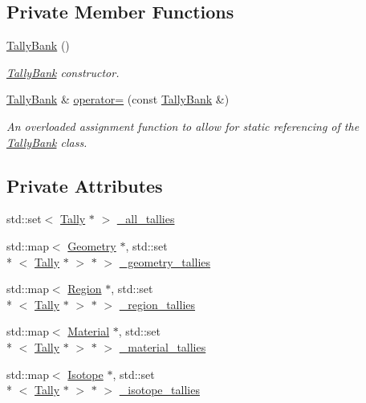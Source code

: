 \subsection*{Private Member Functions}
\begin{DoxyCompactItemize}
\item 
\hypertarget{classTallyBank_a9bfccb9be181dd2f293ba43428923d1c}{\hyperlink{classTallyBank_a9bfccb9be181dd2f293ba43428923d1c}{Tally\-Bank} ()}\label{classTallyBank_a9bfccb9be181dd2f293ba43428923d1c}

\begin{DoxyCompactList}\small\item\em \hyperlink{classTallyBank}{Tally\-Bank} constructor. \end{DoxyCompactList}\item 
\hyperlink{classTallyBank}{Tally\-Bank} \& \hyperlink{classTallyBank_a17f7549e89865f3841fccd876f7c62f7}{operator=} (const \hyperlink{classTallyBank}{Tally\-Bank} \&)
\begin{DoxyCompactList}\small\item\em An overloaded assignment function to allow for static referencing of the \hyperlink{classTallyBank}{Tally\-Bank} class. \end{DoxyCompactList}\end{DoxyCompactItemize}
\subsection*{Private Attributes}
\begin{DoxyCompactItemize}
\item 
std\-::set$<$ \hyperlink{classTally}{Tally} $\ast$ $>$ \hyperlink{classTallyBank_a70424c03332fd144a06d4a0b25426fb3}{\-\_\-all\-\_\-tallies}
\item 
std\-::map$<$ \hyperlink{classGeometry}{Geometry} $\ast$, std\-::set\\*
$<$ \hyperlink{classTally}{Tally} $\ast$ $>$ $\ast$ $>$ \hyperlink{classTallyBank_a29eb48c6c05829ac572782ab65d224d4}{\-\_\-geometry\-\_\-tallies}
\item 
std\-::map$<$ \hyperlink{classRegion}{Region} $\ast$, std\-::set\\*
$<$ \hyperlink{classTally}{Tally} $\ast$ $>$ $\ast$ $>$ \hyperlink{classTallyBank_a10180395facd4f1d39d8aa7cf81c6789}{\-\_\-region\-\_\-tallies}
\item 
std\-::map$<$ \hyperlink{classMaterial}{Material} $\ast$, std\-::set\\*
$<$ \hyperlink{classTally}{Tally} $\ast$ $>$ $\ast$ $>$ \hyperlink{classTallyBank_abb5dff298a205ff6bb3aeae5851e78ae}{\-\_\-material\-\_\-tallies}
\item 
std\-::map$<$ \hyperlink{classIsotope}{Isotope} $\ast$, std\-::set\\*
$<$ \hyperlink{classTally}{Tally} $\ast$ $>$ $\ast$ $>$ \hyperlink{classTallyBank_a9d5bb358e7a434a6b6b6a9239a0af353}{\-\_\-isotope\-\_\-tallies}
\end{DoxyCompactItemize}


